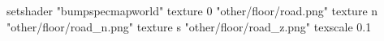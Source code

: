 setshader "bumpspecmapworld"
   texture 0 "other/floor/road.png"
   texture n "other/floor/road_n.png"
   texture s "other/floor/road_z.png"
texscale 0.1